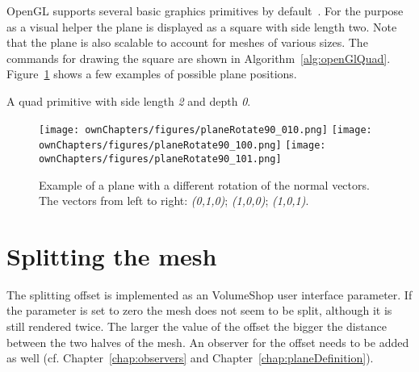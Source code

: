 OpenGL supports several basic graphics primitives by default~\cite{book:computerGraphicsHill}. For the purpose as a visual helper the plane is displayed as a square with side length two. Note that the plane is also scalable to account for meshes of various sizes. The commands for drawing the square are shown in Algorithm~\ref{alg:openGlQuad}. Figure~\ref{fig:plane} shows a few examples of possible plane positions. 
\begin{algorithm}
\;
\Indp{}\;
\;
\;
\;
\;
\Indm{}\;
\BlankLine
\caption{A quad primitive with side length \emph{2} and depth \emph{0}.}
\label{alg:openGlQuad}
\end{algorithm}

\begin{figure}%
\centering
\vspace{5.00mm}
\texttt{[image: ownChapters/figures/planeRotate90\_010.png]}%
\hspace{5.00mm}
\texttt{[image: ownChapters/figures/planeRotate90\_100.png]}%
\hspace{5.00mm}
\texttt{[image: ownChapters/figures/planeRotate90\_101.png]}%
\caption{Example of a plane with a different rotation of the normal vectors. The vectors from left to right: \emph{(0,1,0)}; \emph{(1,0,0)}; \emph{(1,0,1)}.}%
\label{fig:plane}%
\end{figure}

\section{Splitting the mesh}
The splitting offset is implemented as an VolumeShop user interface parameter. If the parameter is set to zero the mesh does not seem to be split, although it is still rendered twice. The larger the value of the offset the bigger the distance between the two halves of the mesh. An observer for the offset needs to be added as well (cf. Chapter~\ref{chap:observers} and Chapter~\ref{chap:planeDefinition}).

